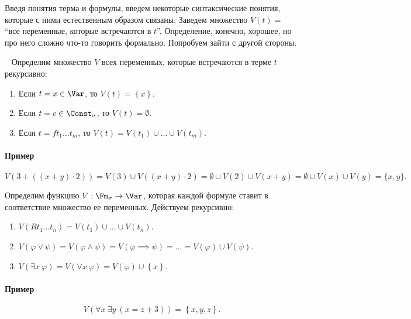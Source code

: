 Введя понятия терма и формулы, введем некоторые синтаксические понятия, которые с ними естественным образом связаны.
Заведем множество $V(t) = $ \enquote{все переменные, которые встречаются в $t$}.
Определение, конечно, хорошее, но про него сложно что-то говорить формально.
Попробуем зайти с другой стороны.
\begin{definition}~
    Определим множество $V$ всех переменных, которые встречаются в терме $t$ рекурсивно:
    \begin{enumerate}
        \item Если $t = x \in \Var$, то $V(t) = \left\{x\right\}$.
        \item Если $t = c \in \Const_{\sigma}$, то $V(t) = \emptyset$.
        \item Если $t = f t_{1} \ldots t_{m}$, то $V(t) = V(t_{1}) \cup \ldots \cup V(t_{m})$.
    \end{enumerate}
\end{definition}

\paragraph{Пример}
$$
    V\left(3 + \left(\left(x + y\right) \cdot 2\right)\right) = V(3) \cup V\left(\left(x + y\right) \cdot 2\right) = \emptyset \cup V\left(2\right) \cup V\left(x + y\right) = \emptyset \cup V(x) \cup V(y) = \{x, y\}.
$$

\begin{definition}
    Определим функцию $V: \Fm_{\sigma} \to \Var$, которая каждой формуле ставит в соответствие множество ее переменных.
    Действуем рекурсивно:
    \begin{enumerate}
        \item $V\left(R t_{1} \ldots t_{n}\right) = V(t_{1}) \cup \ldots \cup V(t_{n})$.
        \item $V\left(\varphi \lor \psi\right) = V\left(\varphi \land \psi\right) = V\left(\varphi \implies \psi\right) = \ldots = V(\varphi) \cup V(\psi)$.
        \item $V(\exists x~\varphi) = V(\forall x~\varphi) = V(\varphi) \cup \left\{x\right\}$.
    \end{enumerate}
\end{definition}

\paragraph{Пример}
$$
    V\left(\forall x~ \exists y~ \left(x = z + 3\right)\right) = \left\{x, y, z\right\}.
$$

